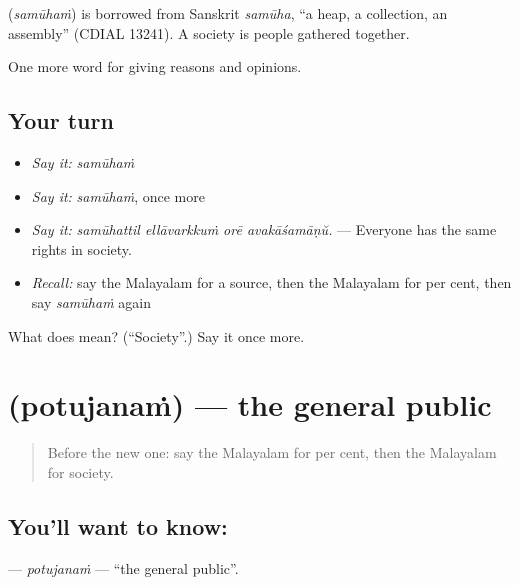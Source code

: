 \begin{cousinweb}
\textbf{} (\emph{samūhaṁ}) is borrowed from Sanskrit \emph{samūha}, \textquotedblleft{}a heap, a collection, an assembly\textquotedblright{} (CDIAL 13241). A society is people gathered together.
\end{cousinweb}

\begin{grammarlens}[title={What you've built}]
One more word for giving reasons and opinions.
\end{grammarlens}

\subsection*{Your turn}
\begin{itemize}
\raggedright
  \item \emph{Say it:} \emph{samūhaṁ}
  \item \emph{Say it:} \emph{samūhaṁ}, once more
  \item \emph{Say it:} \emph{samūhattil ellāvarkkuṁ orē avakāśamāṇŭ.} — Everyone has the same rights in society.
  \item \emph{Recall:} say the Malayalam for a source, then the Malayalam for per cent, then say \emph{samūhaṁ} again
\end{itemize}

\begin{tcolorbox}[breakable,colback=teal!4,colframe=teal!35!black,title={Before you move on}]
What does  mean? (\textquotedblleft{}Society\textquotedblright{}.) Say it once more.
\end{tcolorbox}
\section[\texorpdfstring{\ml{പൊതുജനം} (potujanaṁ)}{പൊതുജനം (potujanaṁ)}]{ (potujanaṁ) — the general public}

\label{lesson:ML-C415-potujanam}



\begin{quote}
Before the new one: say the Malayalam for per cent, then the Malayalam for society.
\end{quote}

\subsection*{You'll want to know: }
\textbf{} — \emph{potujanaṁ} — \textquotedblleft{}the general public\textquotedblright{}.

